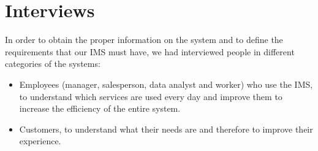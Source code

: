 \section{Interviews}

In order to obtain the proper information on the system and to define the requirements that our IMS must have, we had interviewed people in different categories of the systems:

\begin{itemize}
    \item Employees (manager, salesperson, data analyst and worker) who use the IMS, to understand which services are used every day and improve them to increase the efficiency of the entire system.
    \item Customers, to understand what their needs are and therefore to improve their experience.
\end{itemize}